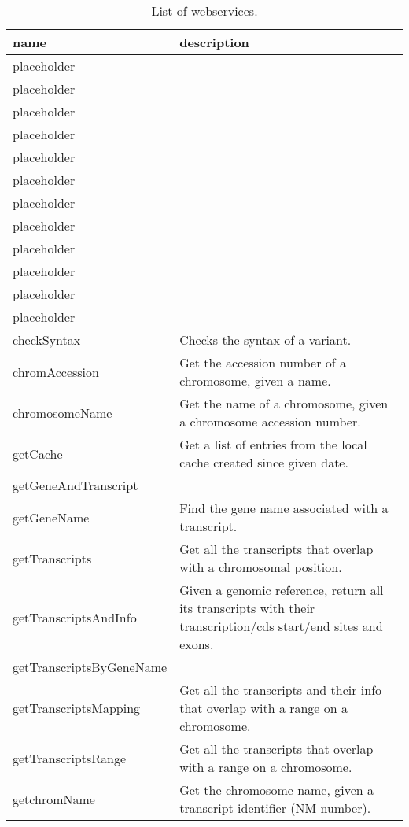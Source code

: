 \begin{longtable}{l|X}
  \caption{List of webservices.}\\
  name                     & description\\
  \hline
  placeholder              & \\
  placeholder              & \\
  placeholder              & \\
  placeholder              & \\
  placeholder              & \\
  placeholder              & \\
  placeholder              & \\
  placeholder              & \\
  placeholder              & \\
  placeholder              & \\
  placeholder              & \\
  placeholder              & \\
  checkSyntax              & Checks the syntax of a variant.\\
  chromAccession           & Get the accession number of a chromosome, given a
    name.\\
  chromosomeName           & Get the name of a chromosome, given a chromosome
    accession number.\\
  getCache                 & Get a list of entries from the local cache created
    since given date.\\
  getGeneAndTranscript     & \\
  getGeneName              & Find the gene name associated with a transcript.\\
  getTranscripts           & Get all the transcripts that overlap with a
    chromosomal position.\\
  getTranscriptsAndInfo    & Given a genomic reference, return all its
    transcripts with their transcription/cds start/end sites and exons.\\
  getTranscriptsByGeneName & \\
  getTranscriptsMapping    & Get all the transcripts and their info that
    overlap with a range on a chromosome.\\
  getTranscriptsRange      & Get all the transcripts that overlap with a range
    on a chromosome.\\
  getchromName             & Get the chromosome name, given a transcript
    identifier (NM number).\\

\end{longtable}
